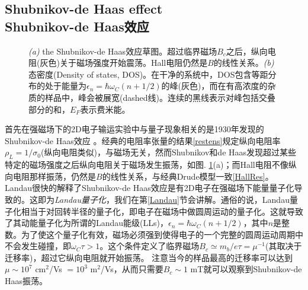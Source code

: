 \documentclass[10pt]{book}
\newcommand\itt{\it\color{blue}}
\begin{document}
\subsection[Shubnikov-de Haas效应]{Shubnikov-de Haas effect\\\bf Shubnikov-de Haas效应}

\begin{figure}
\begin{center}
\end{center}
\caption{ {\sl (a)} the Shubnikov-de Haas效应草图。超过临界磁场$B_c$之后，纵向电阻(灰色)关于磁场强度开始震荡。Hall电阻仍然是$B$的线性关系。{\sl (b)} 态密度(Density of states, DOS)。在干净的系统中，DOS包含等距分布的处于能量为$\epsilon_n=\hbar\omega_C(n+1/2)$的峰(灰色)，而在有高浓度的杂质的样品中，峰会被展宽(dashed线)。连续的黑线表示对峰包括交叠部分的和，$E_F$表示费米能。}
\label{fig02}
\end{figure}

首先在强磁场下的2D电子输运实验中与量子现象相关的是1930年发现的Shubnikov-de Haas效应 \cite{SdH}。经典的电阻率张量的结果\eqref{restens}规定纵向电阻率$\rho_L=1/\sigma_0$(纵向电阻类似)，与磁场无关，然而Shubnikov和de Haas发现超过某些特定的磁场强度之后纵向电阻关于磁场发生振荡，如图. \ref{fig02}(a)；而Hall电阻不像纵向电阻那样振荡，仍然是$B$的线性关系，与经典Drude模型一致\eqref{HallRes}。
Landau很快的解释了Shubnikov-de Haas效应是有2D电子在强磁场下能量量子化导致的。这即为{\itt Landau量子化}，我们在第\ref{Landau}节会讲解。通俗的说，Landau量子化相当于对回转半径的量子化，即电子在磁场中做圆周运动的量子化。这就导致了其动能量子化为所谓的Landau能级(LLs)，$\epsilon_n=\hbar \omega_C(n+1/2)$，其中$n$是整数。为了使这个量子化有效，磁场必须强到使得电子的一个完整的圆周运动周期中不会发生碰撞，即$\omega_C\tau>1$。这个条件定义了临界磁场$B_c\simeq m_b/e\tau=\mu^{-1}$(其取决于迁移率)，超过它纵向电阻就开始振荡。
注意当今的样品最高的迁移率可以达到$\mu\sim 10^{7}$ cm$^2$/Vs $=10^3$ m$^2$/Vs，从而只需要$B_c\sim 1$ mT就可以观察到Shubnikov-de Haas振荡。
\end{document}
